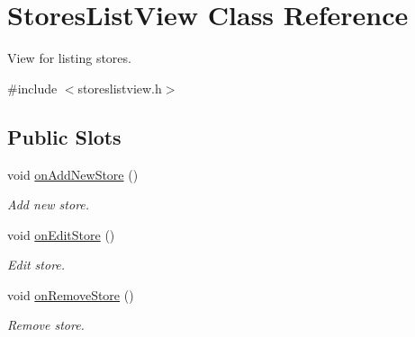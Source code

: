 \hypertarget{class_stores_list_view}{\section{\-Stores\-List\-View \-Class \-Reference}
\label{class_stores_list_view}
}


\-View for listing stores.  




{\ttfamily \#include $<$storeslistview.\-h$>$}

\subsection*{\-Public \-Slots}
\begin{DoxyCompactItemize}
\item 
void \hyperlink{class_stores_list_view_a43315e53458b6cb842265c62207e0647}{on\-Add\-New\-Store} ()
\begin{DoxyCompactList}\small\item\em \-Add new store. \end{DoxyCompactList}\item 
void \hyperlink{class_stores_list_view_a4930432ffb43bfdbe33530d74f8c0427}{on\-Edit\-Store} ()
\begin{DoxyCompactList}\small\item\em \-Edit store. \end{DoxyCompactList}\item 
void \hyperlink{class_stores_list_view_abd6f8c1633e80411cf7dc1f6b718f4f2}{on\-Remove\-Store} ()
\begin{DoxyCompactList}\small\item\em \-Remove store. \end{DoxyCompactList}\end{DoxyCompactItemize}
